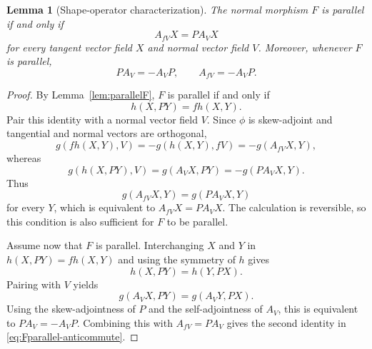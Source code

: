 \documentclass[10pt,a4paper]{amsart}
\newtheorem{lemma}{Lemma}
\begin{document}
\begin{lemma}[Shape-operator characterization]\label{lem:Fparallel-shape}
The normal morphism \(F\) is parallel if and only if
\begin{equation}\label{eq:Fparallel-shape}
 A_{fV}X=P A_VX
\end{equation}
for every tangent vector field \(X\) and normal vector field \(V\).
Moreover, whenever \(F\) is parallel,
\begin{equation}\label{eq:Fparallel-anticommute}
 PA_V=-A_VP,
 \qquad
 A_{fV}=-A_VP .
\end{equation}
\end{lemma}

\begin{proof}
By Lemma~\ref{lem:parallelF}, \(F\) is parallel if and only if
\[
 h(X,PY)=f h(X,Y).
\]
Pair this identity with a normal vector field \(V\). Since \(\phi\) is
skew-adjoint and tangential and normal vectors are orthogonal,
\[
 g(fh(X,Y),V)
 =-g(h(X,Y),fV)
 =-g(A_{fV}X,Y),
\]
whereas
\[
 g(h(X,PY),V)
 =g(A_VX,PY)
 =-g(PA_VX,Y).
\]
Thus
\[
 g(A_{fV}X,Y)=g(PA_VX,Y)
\]
for every \(Y\), which is equivalent to
\(A_{fV}X=PA_VX\).  The calculation is reversible, so this condition is
also sufficient for \(F\) to be parallel.

Assume now that \(F\) is parallel.  Interchanging \(X\) and \(Y\) in
\(h(X,PY)=fh(X,Y)\) and using the symmetry of \(h\) gives
\[
 h(X,PY)=h(Y,PX).
\]
Pairing with \(V\) yields
\[
 g(A_VX,PY)=g(A_VY,PX).
\]
Using the skew-adjointness of \(P\) and the self-adjointness of \(A_V\),
this is equivalent to \(PA_V=-A_VP\). Combining this with
\(A_{fV}=PA_V\) gives the second identity in
\eqref{eq:Fparallel-anticommute}.
\end{proof}
\end{document}
